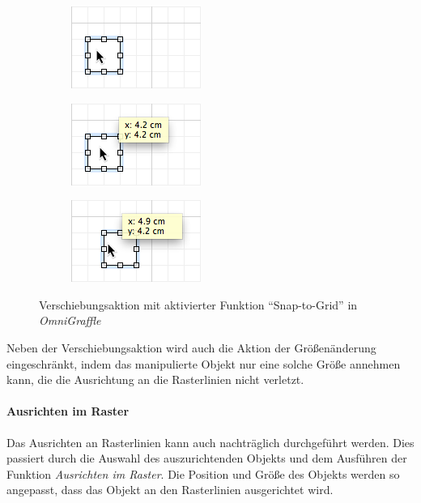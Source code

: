\begin{figure}[hbt]
    \newcommand{\subfigurewidth}{0.33\textwidth}
    \newcommand{\graphicswidth}{0.95\linewidth}
    \begin{subfigure}{\subfigurewidth}
        \centering
        \includegraphics[width=\graphicswidth]{assets/omnigraffle-snap-to-grid-on-a}
        \caption{}
    \end{subfigure}
    \begin{subfigure}{\subfigurewidth}
        \centering
        \includegraphics[width=\graphicswidth]{assets/omnigraffle-snap-to-grid-on-b}
        \caption{}
    \end{subfigure}
    \begin{subfigure}{\subfigurewidth}
        \centering
        \includegraphics[width=\graphicswidth]{assets/omnigraffle-snap-to-grid-on-c}
        \caption{}
    \end{subfigure}
    \caption{Verschiebungsaktion mit aktivierter Funktion \enquote{Snap-to-Grid} in \textit{OmniGraffle}}
    \label{fig:omnigraffle-snap-to-grid-on}
\end{figure}

Neben der Verschiebungsaktion wird auch die Aktion der Größenänderung eingeschränkt, indem das manipulierte Objekt nur eine solche Größe annehmen kann, die die Ausrichtung an die Rasterlinien nicht verletzt.

\paragraph{Ausrichten im Raster}

Das Ausrichten an Rasterlinien kann auch nachträglich durchgeführt werden. Dies passiert durch die Auswahl des auszurichtenden Objekts und dem Ausführen der Funktion \textit{Ausrichten im Raster}. Die Position und Größe des Objekts werden so angepasst, dass das Objekt an den Rasterlinien ausgerichtet wird.

